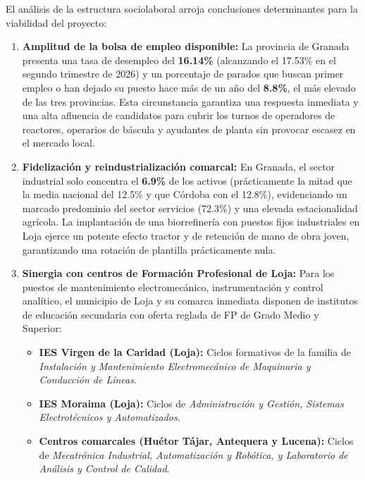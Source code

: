 \documentclass{report}
\begin{document}
El análisis de la estructura sociolaboral arroja conclusiones determinantes para la viabilidad del proyecto:
\begin{enumerate}
    \item \textbf{Amplitud de la bolsa de empleo disponible:} La provincia de Granada presenta una tasa de desempleo del \textbf{\num{16.14}\%} (alcanzando el \num{17.53}\% en el segundo trimestre de \num{2026}) y un porcentaje de parados que buscan primer empleo o han dejado su puesto hace más de un año del \textbf{\num{8.8}\%}, el más elevado de las tres provincias. Esta circunstancia garantiza una respuesta inmediata y una alta afluencia de candidatos para cubrir los turnos de operadores de reactores, operarios de báscula y ayudantes de planta sin provocar escasez en el mercado local.
    \item \textbf{Fidelización y reindustrialización comarcal:} En Granada, el sector industrial solo concentra el \textbf{\num{6.9}\%} de los activos (prácticamente la mitad que la media nacional del \num{12.5}\% y que Córdoba con el \num{12.8}\%), evidenciando un marcado predominio del sector servicios (\num{72.3}\%) y una elevada estacionalidad agrícola. La implantación de una biorrefinería con puestos fijos industriales en Loja ejerce un potente efecto tractor y de retención de mano de obra joven, garantizando una rotación de plantilla prácticamente nula.
    \item \textbf{Sinergia con centros de Formación Profesional de Loja:} Para los puestos de mantenimiento electromecánico, instrumentación y control analítico, el municipio de Loja y su comarca inmediata disponen de institutos de educación secundaria con oferta reglada de FP de Grado Medio y Superior:
          \begin{itemize}
              \item \textbf{IES Virgen de la Caridad (Loja):} Ciclos formativos de la familia de \textit{Instalación y Mantenimiento Electromecánico de Maquinaria y Conducción de Líneas}.
              \item \textbf{IES Moraima (Loja):} Ciclos de \textit{Administración y Gestión, Sistemas Electrotécnicos y Automatizados}.
              \item \textbf{Centros comarcales (Huétor Tájar, Antequera y Lucena):} Ciclos de \textit{Mecatrónica Industrial, Automatización y Robótica, y Laboratorio de Análisis y Control de Calidad}.
          \end{itemize}
\end{enumerate}
\end{document}
